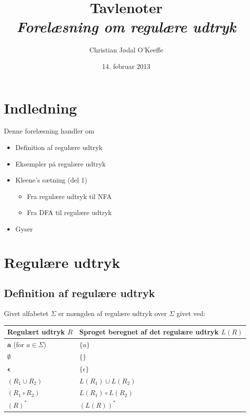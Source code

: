 \documentclass[a4paper,10pt,article]{memoir}
\title{Tavlenoter \\ \emph{Forelæsning om regulære udtryk}}
\author{Christian Jødal O'Keeffe}
\date{14. februar 2013}
\begin{document}
\maketitle

\tableofcontents*

\chapter{Indledning}

Denne forelæsning handler om

\begin{itemize}
\item Definition af regulære udtryk
\item Eksempler på regulære udtryk
\item Kleene's sætning (del 1)
\begin{itemize}
\item Fra regulære udtryk til NFA
\item Fra DFA til regulære udtryk
\end{itemize}
\item Gyser
\end{itemize}

\chapter{Regulære udtryk}
\section{Definition af regulære udtryk}

\begin{definition}
Givet alfabetet $\Sigma$ er mængden af regulære udtryk over $\Sigma$ givet ved:

\begin{tabular}{|l|l|}
        \hline
        \textbf{Regulært udtryk $R$} & \textbf{Sproget beregnet af det
          regulære udtryk $L(R)$} \\ \hline
        $\mathbf{a}$ (for $a \in \Sigma$) & $\{a\}$ \\ 
        $\mathbf{\emptyset}$ &$\{\}$ \\ 
        $\mathbf{\epsilon}$ & $\{\epsilon\}$ \\
        \hline 
        $(R_1 \cup R_2)$ & $L(R_1) \cup L(R_2)$ \\ 
        $(R_1 \circ R_2)$ & $L(R_1) \circ L(R_2)$  \\ 
        $(R)^*$ & $(L(R))^*$ \\
        \hline
    \end{tabular}

\end{definition}
\end{document}
